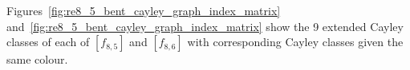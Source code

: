 \documentclass[12pt,a4paper]{article}
\begin{document}
Figures~\ref{fig:re8_5_bent_cayley_graph_index_matrix} and~\ref{fig:re8_5_bent_cayley_graph_index_matrix}
show the 9 extended Cayley classes of each of $[f_{8,5}]$ and $[f_{8,6}]$ with corresponding Cayley classes
given the same colour.
%
\end{document}
